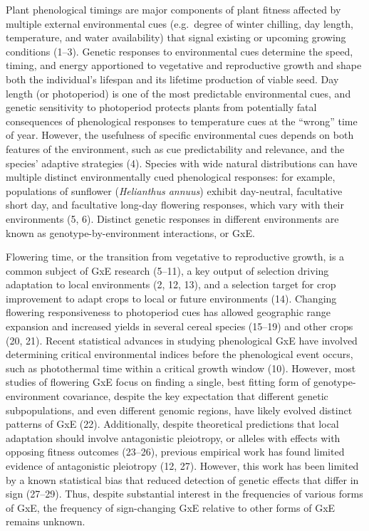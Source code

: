 \documentclass[
  9pt,
  twocolumn,
  twoside]{pnas-new}
\begin{document}
Plant phenological timings are major components of plant fitness
affected by multiple external environmental cues (e.g.~degree of winter
chilling, day length, temperature, and water availability) that signal
existing or upcoming growing conditions (1--3). Genetic responses to
environmental cues determine the speed, timing, and energy apportioned
to vegetative and reproductive growth and shape both the individual's
lifespan and its lifetime production of viable seed. Day length (or
photoperiod) is one of the most predictable environmental cues, and
genetic sensitivity to photoperiod protects plants from potentially
fatal consequences of phenological responses to temperature cues at the
``wrong'' time of year. However, the usefulness of specific
environmental cues depends on both features of the environment, such as
cue predictability and relevance, and the species' adaptive strategies
(4). Species with wide natural distributions can have multiple distinct
environmentally cued phenological responses: for example, populations of
sunflower (\emph{Helianthus annuus}) exhibit day-neutral, facultative
short day, and facultative long-day flowering responses, which vary with
their environments (5, 6). Distinct genetic responses in different
environments are known as genotype-by-environment interactions, or GxE.

Flowering time, or the transition from vegetative to reproductive
growth, is a common subject of GxE research (5--11), a key output of
selection driving adaptation to local environments (2, 12, 13), and a
selection target for crop improvement to adapt crops to local or future
environments (14). Changing flowering responsiveness to photoperiod cues
has allowed geographic range expansion and increased yields in several
cereal species (15--19) and other crops (20, 21). Recent statistical
advances in studying phenological GxE have involved determining critical
environmental indices before the phenological event occurs, such as
photothermal time within a critical growth window (10). However, most
studies of flowering GxE focus on finding a single, best fitting form of
genotype-environment covariance, despite the key expectation that
different genetic subpopulations, and even different genomic regions,
have likely evolved distinct patterns of GxE (22). Additionally, despite
theoretical predictions that local adaptation should involve
antagonistic pleiotropy, or alleles with effects with opposing fitness
outcomes (23--26), previous empirical work has found limited evidence of
antagonistic pleiotropy (12, 27). However, this work has been limited by
a known statistical bias that reduced detection of genetic effects that
differ in sign (27--29). Thus, despite substantial interest in the
frequencies of various forms of GxE, the frequency of sign-changing GxE
relative to other forms of GxE remains unknown.
\end{document}
